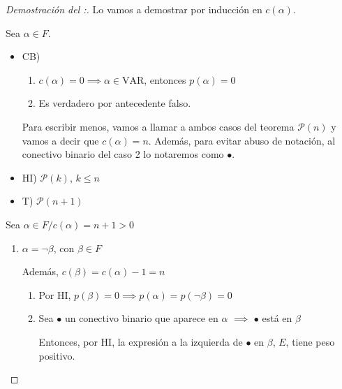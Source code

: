 \begin{proof}[Demostración del :] \phantom{.}

    Lo vamos a demostrar por inducción en $c(\alpha)$.

    Sea $\alpha \in F$.

    \begin{itemize}
        \item CB) 
        \begin{enumerate}
            \item $c(\alpha) = 0 \implies \alpha \in \mathrm{VAR}$, entonces 
            $p(\alpha)=0$
            \item Es verdadero por antecedente falso.
        \end{enumerate}

        Para escribir menos, vamos a llamar a ambos casos del teorema 
        $\mathcal{P}(n)$ y vamos a decir que $c(\alpha)=n$. 
        Además, para evitar abuso de notación, al conectivo binario del caso
        2 lo notaremos como $\bullet$.

        \item HI) $\mathcal{P}(k)$, $k \leq n$
        \item T) $\mathcal{P}(n+1)$
    \end{itemize}       

    Sea $\alpha \in F / c(\alpha) =  n+1 > 0$

    \begin{enumerate}[%
                labelindent=*,
                style=multiline,
                leftmargin=*,
                align=left,
                leftmargin=2\parindent,
                label=Caso \arabic*)]
        \item $\alpha = \neg \beta$, con $\beta \in F$

            Además, $c(\beta) = c(\alpha) -1 = n$

            \begin{enumerate}
                \item Por HI, $p(\beta)=0 \implies p(\alpha) 
                    = p(\neg \beta) = 0$

                    \item Sea $\bullet$ un conectivo binario que aparece
                        en $\alpha$ $\implies$ $\bullet$ está en $\beta$

                Entonces, por HI, la expresión a la izquierda de $\bullet$
                en $\beta$, $E$, tiene peso positivo.


\end{enumerate}
\end{enumerate}
\end{proof}
